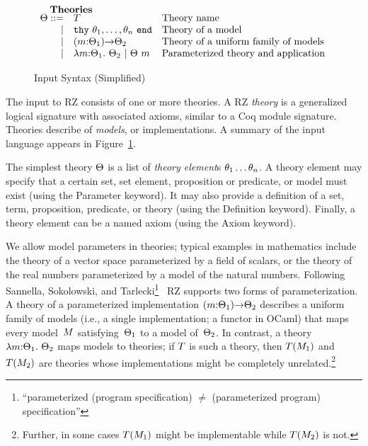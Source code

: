 \begin{figure}
\[\begin{array}{rl@{\quad}l}
  		\noalign{\textbf{Theories}}
		\ith ::= 
		     & \iTH&\mbox{Theory name}\\
		   	| & \ithy{\ite_1,\ldots,\ite_n} &\mbox{Theory of a model}\\
		 	| & \idarrow{\iM}{\ith_1}{\ith_2} &\mbox{Theory of a uniform family of models}\\
		  	| & \ilambda{\iM}{\ith_1}{\ith_2} \ibar 
		      \iapp{\ith}{\iM}&\mbox{Parameterized theory and application}\\
	\end{array}
	\]
	\label{fig:input}
	\caption{Input Syntax (Simplified)}
\end{figure}

The input to RZ consists of one or more theories.
A RZ \emph{theory} is a generalized logical signature with associated
axioms, similar to a Coq module signature. Theories describe
of \emph{models}, or implementations. A summary of the input
language appears in Figure~\ref{fig:input}.

\iflong
The simplest theory $\Theta$ is a list of \emph{theory element}\/s
$\theta_1 \ldots \theta_n$. A theory element may specify that a certain
set, set element, proposition or predicate, or model must exist (using
the 
\textsf{Parameter} keyword). It may also provide a definition
of a set, term, proposition, predicate, or theory (using the 
\textsf{Definition} keyword). Finally, a theory element can be
a named axiom (using the \textsf{Axiom} keyword).

We allow model parameters in theories; 
typical examples in mathematics include
the theory of a vector space parameterized by a field of scalars,
or the theory of the real numbers parameterized by a model of the
natural numbers.
Following Sannella, Sokolowski, and 
Tarlecki\footnote{``parameterized (program specification) $\neq$ (parameterized program) specification''}~\cite{sannella92:_towar} RZ supports two forms of parameterization.  A theory of a parameterized implementation
$(m{:}\Theta_1){\to}\Theta_2$ describes a uniform family of models (i.e.,
a single implementation; a functor in OCaml) that maps every
model~$M$ satisfying~$\Theta_1$ to a model of~$\Theta_2$.  In contrast,
a theory $\lambda m{:}\Theta_1.\ \Theta_2$
maps models to theories; if $T$ is such a theory, then
$T(M_1)$ and $T(M_2)$ are theories whose implementations might be completely unrelated.\footnote{
Further, in some cases $T(M_1)$ might be implementable while $T(M_2)$ is not.
}


